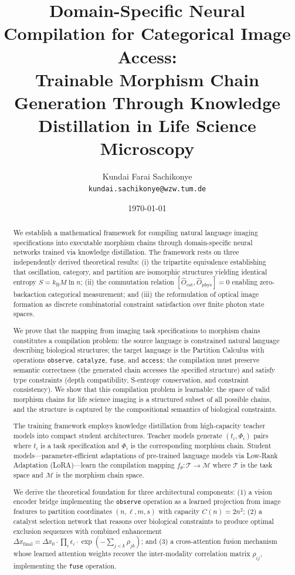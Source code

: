 \documentclass[11pt,a4paper]{article}
\title{Domain-Specific Neural Compilation for Categorical Image Access:\\
\large Trainable Morphism Chain Generation Through Knowledge Distillation in Life Science Microscopy}
\author{
Kundai Farai Sachikonye\\
\texttt{kundai.sachikonye@wzw.tum.de}
}
\date{\today}
\theoremstyle{definition}
\theoremstyle{remark}
\newcommand{\kB}{k_{\mathrm{B}}}
\newcommand{\morphism}{\Phi}
\newcommand{\params}{\theta}
\begin{document}
\maketitle

\begin{abstract}
We establish a mathematical framework for compiling natural language imaging specifications into executable morphism chains through domain-specific neural networks trained via knowledge distillation. The framework rests on three independently derived theoretical results: (i) the tripartite equivalence establishing that oscillation, category, and partition are isomorphic structures yielding identical entropy $S = \kB M \ln n$; (ii) the commutation relation $[\hat{O}_{\mathrm{cat}}, \hat{O}_{\mathrm{phys}}] = 0$ enabling zero-backaction categorical measurement; and (iii) the reformulation of optical image formation as discrete combinatorial constraint satisfaction over finite photon state spaces.

We prove that the mapping from imaging task specifications to morphism chains constitutes a compilation problem: the source language is constrained natural language describing biological structures; the target language is the Partition Calculus with operations \texttt{observe}, \texttt{catalyze}, \texttt{fuse}, and \texttt{access}; the compilation must preserve semantic correctness (the generated chain accesses the specified structure) and satisfy type constraints (depth compatibility, S-entropy conservation, and constraint consistency). We show that this compilation problem is learnable: the space of valid morphism chains for life science imaging is a structured subset of all possible chains, and the structure is captured by the compositional semantics of biological constraints.

The training framework employs knowledge distillation from high-capacity teacher models into compact student architectures. Teacher models generate $(t_i, \morphism_i)$ pairs where $t_i$ is a task specification and $\morphism_i$ is the corresponding morphism chain. Student models---parameter-efficient adaptations of pre-trained language models via Low-Rank Adaptation (LoRA)---learn the compilation mapping $f_\params: \mathcal{T} \to \mathcal{M}$ where $\mathcal{T}$ is the task space and $\mathcal{M}$ is the morphism chain space.

We derive the theoretical foundation for three architectural components: (1) a vision encoder bridge implementing the \texttt{observe} operation as a learned projection from image features to partition coordinates $(n, \ell, m, s)$ with capacity $C(n) = 2n^2$; (2) a catalyst selection network that reasons over biological constraints to produce optimal exclusion sequences with combined enhancement $\Delta x_{\mathrm{final}} = \Delta x_0 \cdot \prod_i \epsilon_i \cdot \exp(-\sum_{j<k} \rho_{jk})$; and (3) a cross-attention fusion mechanism whose learned attention weights recover the inter-modality correlation matrix $\rho_{ij}$, implementing the \texttt{fuse} operation.


\end{abstract}
\end{document}
